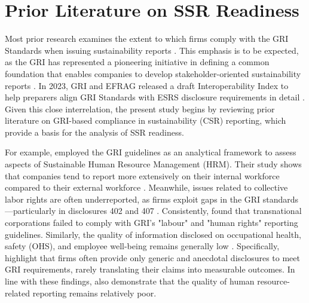 \section{Prior Literature on SSR Readiness}

Most prior research examines the extent to which firms comply with the GRI Standards 
when issuing sustainability reports \parencite{Fonseca2014, Vigneau2015}. 
This emphasis is to be expected, as the GRI has represented a pioneering initiative 
in defining a common foundation that enables companies to develop stakeholder-oriented 
sustainability reports \parencite{Carungu2025, Dumay2010}. In 2023, GRI and EFRAG released a draft 
Interoperability Index to help preparers align GRI Standards with ESRS disclosure 
requirements in detail \parencite{GRIEFRAG2024}. Given this close interrelation, the present study begins 
by reviewing prior literature on GRI-based compliance in sustainability (CSR) reporting, 
which provide a basis for the analysis of SSR readiness.

For example, \textcite{Ehnert2016} employed the GRI guidelines as an analytical framework 
to assess aspects of Sustainable Human Resource Management (HRM). Their study shows that 
companies tend to report more extensively on their internal workforce compared to their 
external workforce \parencite{Ehnert2016}. Meanwhile, issues related to collective labor 
rights are often underreported, as firms exploit gaps in the GRI standards—particularly 
in disclosures 402 and 407 \parencite{Waas2021}. Consistently, \textcite{Parsa2018} found 
that transnational corporations failed to comply with GRI's "labour" and "human rights"
reporting guidelines. Similarly, the quality of information disclosed on occupational 
health, safety (OHS), and employee well-being remains generally low \parencite{Mariappanadar2022}. 
Specifically, \textcite{Mariappanadar2022} highlight that firms often provide only generic and 
anecdotal disclosures to meet GRI requirements, rarely translating their claims into measurable
outcomes. In line with these findings, \textcite{Chauvey2015} also demonstrate that the quality
of human resource-related reporting remains relatively poor.

